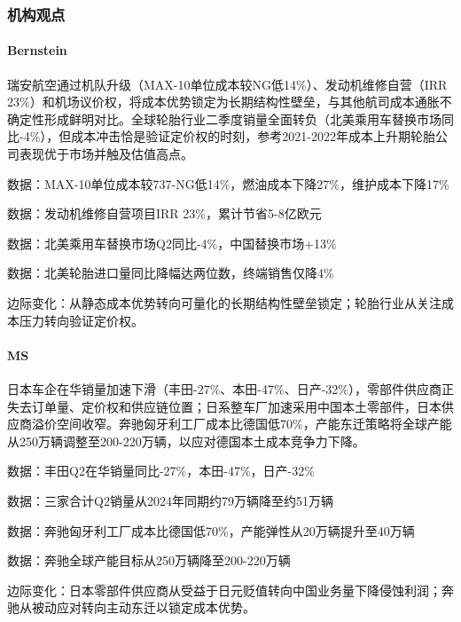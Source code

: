 \documentclass[11pt]{ctexart}
\begin{document}
\subsubsection*{机构观点}
\paragraph{Bernstein} 瑞安航空通过机队升级（MAX-10单位成本较NG低14\%）、发动机维修自营（IRR 23\%）和机场议价权，将成本优势锁定为长期结构性壁垒，与其他航司成本通胀不确定性形成鲜明对比。全球轮胎行业二季度销量全面转负（北美乘用车替换市场同比-4\%），但成本冲击恰是验证定价权的时刻，参考2021-2022年成本上升期轮胎公司表现优于市场并触及估值高点。
{\small\color{refgray}数据：MAX-10单位成本较737-NG低14\%，燃油成本下降27\%，维护成本下降17\%\par}
{\small\color{refgray}数据：发动机维修自营项目IRR 23\%，累计节省5-8亿欧元\par}
{\small\color{refgray}数据：北美乘用车替换市场Q2同比-4\%，中国替换市场+13\%\par}
{\small\color{refgray}数据：北美轮胎进口量同比降幅达两位数，终端销售仅降4\%\par}
{\small\color{refgray}边际变化：从静态成本优势转向可量化的长期结构性壁垒锁定；轮胎行业从关注成本压力转向验证定价权。\par}
\paragraph{MS} 日本车企在华销量加速下滑（丰田-27\%、本田-47\%、日产-32\%），零部件供应商正失去订单量、定价权和供应链位置；日系整车厂加速采用中国本土零部件，日本供应商溢价空间收窄。奔驰匈牙利工厂成本比德国低70\%，产能东迁策略将全球产能从250万辆调整至200-220万辆，以应对德国本土成本竞争力下降。
{\small\color{refgray}数据：丰田Q2在华销量同比-27\%，本田-47\%，日产-32\%\par}
{\small\color{refgray}数据：三家合计Q2销量从2024年同期约79万辆降至约51万辆\par}
{\small\color{refgray}数据：奔驰匈牙利工厂成本比德国低70\%，产能弹性从20万辆提升至40万辆\par}
{\small\color{refgray}数据：奔驰全球产能目标从250万辆降至200-220万辆\par}
{\small\color{refgray}边际变化：日本零部件供应商从受益于日元贬值转向中国业务量下降侵蚀利润；奔驰从被动应对转向主动东迁以锁定成本优势。\par}
\end{document}
